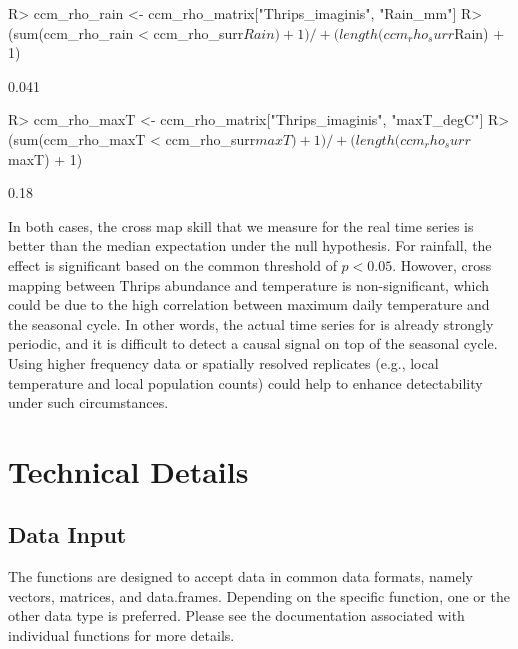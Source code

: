 \documentclass[article]{jss}
\begin{document}
\begin{Schunk}
\begin{Sinput}
R> ccm_rho_rain <- ccm_rho_matrix["Thrips_imaginis", "Rain_mm"]
R> (sum(ccm_rho_rain < ccm_rho_surr$Rain) + 1) /
+      (length(ccm_rho_surr$Rain) + 1)
\end{Sinput}
\begin{Soutput}
[1] 0.041
\end{Soutput}
\end{Schunk}

\begin{Schunk}
\begin{Sinput}
R> ccm_rho_maxT <- ccm_rho_matrix["Thrips_imaginis", "maxT_degC"]
R> (sum(ccm_rho_maxT < ccm_rho_surr$maxT) + 1) /
+      (length(ccm_rho_surr$maxT) + 1)
\end{Sinput}
\begin{Soutput}
[1] 0.18
\end{Soutput}
\end{Schunk}

In both cases, the cross map skill that we measure for the real time series is better than the median expectation under the null hypothesis. For rainfall, the effect is significant based on the common threshold of $p < 0.05$. Howover, cross mapping between Thrips abundance and temperature is non-significant, which could be due to the high correlation between maximum daily temperature and the seasonal cycle. In other words, the actual time series for  is already strongly periodic, and it is difficult to detect a causal signal on top of the seasonal cycle. Using higher frequency data or spatially resolved replicates (e.g., local temperature and local population counts) could help to enhance detectability under such circumstances.

\section{Technical Details}\label{sec:technical-details}

\subsection{Data Input}\label{sec:data-input}

The  functions are designed to accept data in common  data formats, namely vectors, matrices, and data.frames. Depending on the specific function, one or the other data type is preferred. Please see the documentation associated with individual functions for more details.
\end{document}
